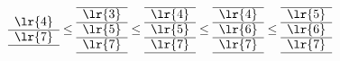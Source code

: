 \[\begin{array}[c]{*{1}c}
\lr{4}\\\cline{1-1}
\lr{7}\\\cline{1-1}
\end{array}
\le
\begin{array}[c]{*{1}c}\cline{1-1}
\lr{3}\\\cline{1-1}
\lr{5}\\\cline{1-1}
\lr{7}\\\cline{1-1}
\end{array}
\le
\begin{array}[c]{*{1}c}\cline{1-1}
\lr{4}\\\cline{1-1}
\lr{5}\\\cline{1-1}
\lr{7}\\\cline{1-1}
\end{array}
\le
\begin{array}[c]{*{1}c}\cline{1-1}
\lr{4}\\\cline{1-1}
\lr{6}\\\cline{1-1}
\lr{7}\\\cline{1-1}
\end{array}
\le
\begin{array}[c]{*{1}c}\cline{1-1}
\lr{5}\\\cline{1-1}
\lr{6}\\\cline{1-1}
\lr{7}\\\cline{1-1}
\end{array}

\]